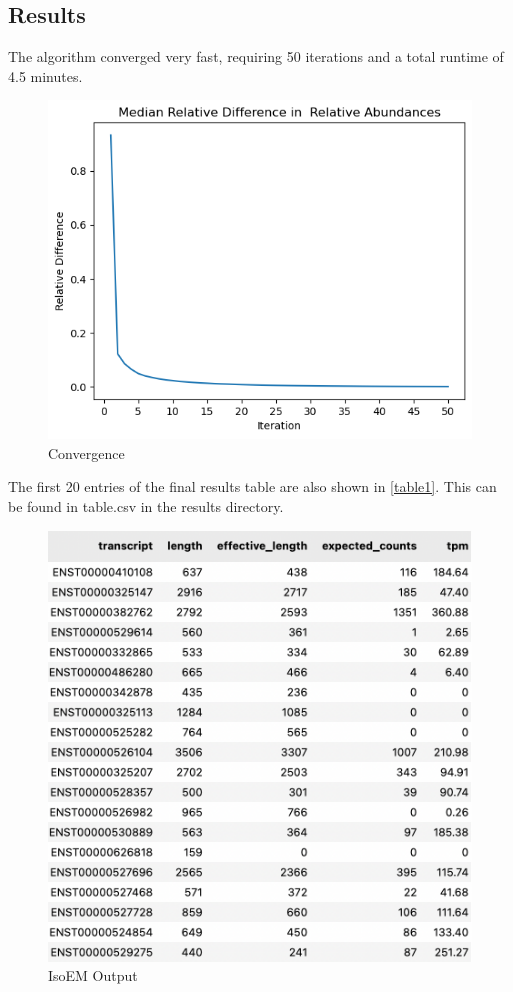 \documentclass{article}
\begin{document}
\subsection*{Results}

The algorithm converged very fast, requiring 50 iterations and a total runtime of 4.5 minutes.

\begin{figure}[H]
    \centering
      \includegraphics[width=0.8\linewidth]{./images/convergence.png}
  \caption{Convergence}\label{figure1}%
\end{figure}

The first 20 entries of the final results table are also shown in \autoref{table1}. This can be found in table.csv in the results directory.

\begin{figure}[H]
    \centering
      \includegraphics[width=0.8\linewidth]{./images/table.png}
  \caption{IsoEM Output}\label{table1}%
\end{figure}
\end{document}
